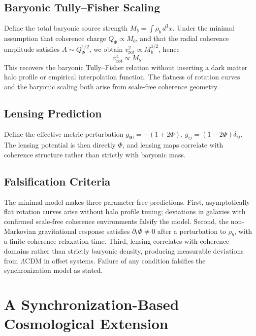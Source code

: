 \documentclass[11pt, a4paper, twocolumn]{article}
\begin{document}
\subsection{Baryonic Tully--Fisher Scaling}

Define the total baryonic source strength $M_b = \int\rho_b\,d^3x$. Under the
minimal assumption that coherence charge $Q_\Phi \propto M_b$, and that the
radial coherence amplitude satisfies $A \sim Q_\Phi^{1/2}$, we obtain
$v_{\mathrm{rot}}^2 \propto M_b^{1/2}$, hence
\[
    v_{\mathrm{rot}}^4 \propto M_b.
\]
This recovers the baryonic Tully--Fisher relation without inserting a dark
matter halo profile or empirical interpolation function. The flatness of
rotation curves and the baryonic scaling both arise from scale-free coherence
geometry.

\subsection{Lensing Prediction}

Define the effective metric perturbation $g_{00} = -(1+2\Phi)$,
$g_{ij} = (1-2\Phi)\delta_{ij}$. The lensing potential is then directly
$\Phi$, and lensing maps correlate with coherence structure rather than
strictly with baryonic mass.

\subsection{Falsification Criteria}

The minimal model makes three parameter-free predictions. First, asymptotically
flat rotation curves arise without halo profile tuning; deviations in galaxies
with confirmed scale-free coherence environments falsify the model. Second, the
non-Markovian gravitational response satisfies $\partial_t\Phi \neq 0$ after a
perturbation to $\rho_b$, with a finite coherence relaxation time. Third,
lensing correlates with coherence domains rather than strictly baryonic density,
producing measurable deviations from $\Lambda$CDM in offset systems. Failure of
any condition falsifies the synchronization model as stated.

\section{A Synchronization-Based Cosmological Extension}
\end{document}
